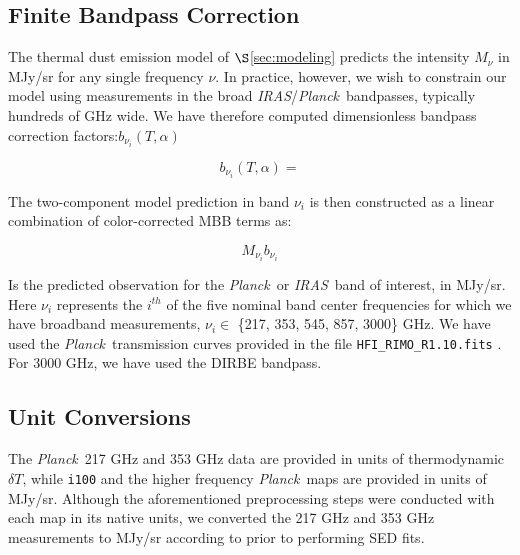 \documentclass{emulateapj}
\newcommand{\IRAS}{{\it IRAS}}
\newcommand{\PLANCK}{{\it Planck}}
\begin{document}
\subsection{Finite Bandpass Correction}
\label{sec:bpcorr}
The thermal dust emission model of $\S$\ref{sec:modeling} predicts the 
intensity $M_{\nu}$ in MJy/sr for any single frequency $\nu$. In practice, 
however, we wish to constrain our model using measurements in the broad 
\IRAS/\PLANCK~bandpasses, typically hundreds of GHz wide. We have therefore 
computed dimensionless bandpass correction factors:$b_{\nu_i}(T, \alpha)$ 

\begin{equation}
b_{\nu_i}(T, \alpha) = 
\end{equation}

The two-component model prediction in band $\nu_i$ is then constructed
as a linear combination of color-corrected MBB terms as:

\begin{equation}
M_{\nu_i}b_{\nu_i}
\end{equation}


Is the predicted observation for the \PLANCK~or \IRAS~band of interest, in 
MJy/sr. Here $\nu_i$ represents the $i^{th}$ of the 
five nominal band center frequencies for which we have broadband measurements, 
$\nu_i \in$ \{217, 353, 545, 857, 3000\} GHz. We have used the 
\PLANCK~transmission curves provided in the file \verb|HFI_RIMO_R1.10.fits| 
\citep{planckresponse}. For 3000 GHz, we have used the DIRBE bandpass. 


\subsection{Unit Conversions}

The \PLANCK~217 GHz and 353 GHz data are provided in units of thermodynamic 
$\delta T$, while \verb|i100| and the higher frequency \PLANCK~maps are 
provided in units of MJy/sr. Although the aforementioned preprocessing steps 
were conducted with each map in its native units, we converted the 217 GHz and 
353 GHz measurements to MJy/sr according to \cite{planckresponse} prior to 
performing SED fits.
\end{document}
